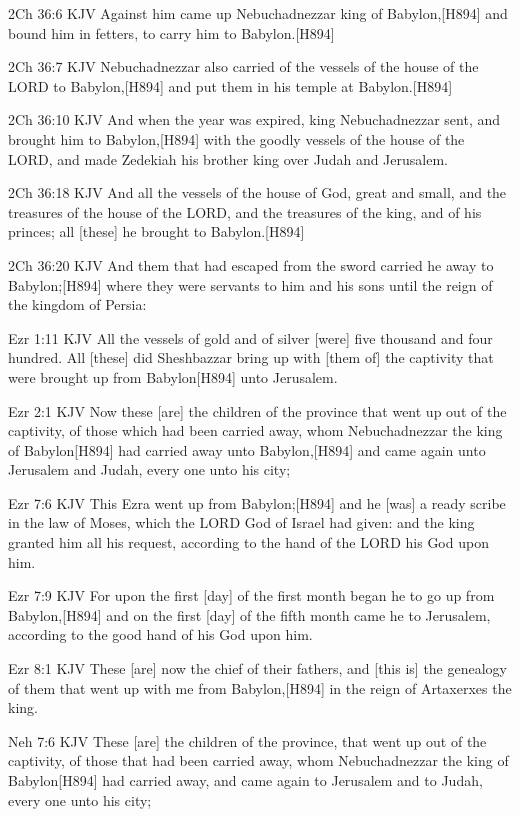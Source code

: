 \documentclass{book}
\begin{document}
2Ch 36:6 KJV
Against him came up Nebuchadnezzar king of Babylon,[H894] and bound him in fetters, to carry him to Babylon.[H894]

2Ch 36:7 KJV
Nebuchadnezzar also carried of the vessels of the house of the LORD to Babylon,[H894] and put them in his temple at Babylon.[H894]

2Ch 36:10 KJV
And when the year was expired, king Nebuchadnezzar sent, and brought him to Babylon,[H894] with the goodly vessels of the house of the LORD, and made Zedekiah his brother king over Judah and Jerusalem.

2Ch 36:18 KJV
And all the vessels of the house of God, great and small, and the treasures of the house of the LORD, and the treasures of the king, and of his princes; all [these] he brought to Babylon.[H894]

2Ch 36:20 KJV
And them that had escaped from the sword carried he away to Babylon;[H894] where they were servants to him and his sons until the reign of the kingdom of Persia:

Ezr 1:11 KJV
All the vessels of gold and of silver [were] five thousand and four hundred. All [these] did Sheshbazzar bring up with [them of] the captivity that were brought up from Babylon[H894] unto Jerusalem.

Ezr 2:1 KJV
Now these [are] the children of the province that went up out of the captivity, of those which had been carried away, whom Nebuchadnezzar the king of Babylon[H894] had carried away unto Babylon,[H894] and came again unto Jerusalem and Judah, every one unto his city;

Ezr 7:6 KJV
This Ezra went up from Babylon;[H894] and he [was] a ready scribe in the law of Moses, which the LORD God of Israel had given: and the king granted him all his request, according to the hand of the LORD his God upon him.

Ezr 7:9 KJV
For upon the first [day] of the first month began he to go up from Babylon,[H894] and on the first [day] of the fifth month came he to Jerusalem, according to the good hand of his God upon him.

Ezr 8:1 KJV
These [are] now the chief of their fathers, and [this is] the genealogy of them that went up with me from Babylon,[H894] in the reign of Artaxerxes the king.

Neh 7:6 KJV
These [are] the children of the province, that went up out of the captivity, of those that had been carried away, whom Nebuchadnezzar the king of Babylon[H894] had carried away, and came again to Jerusalem and to Judah, every one unto his city;
\end{document}
